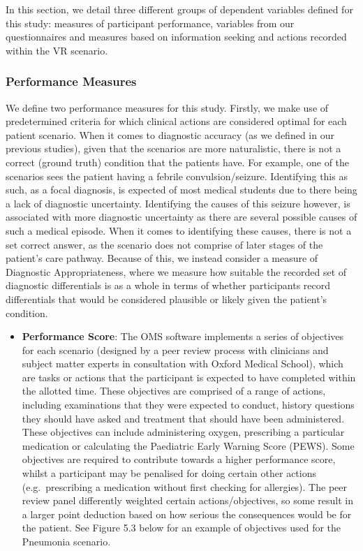 \documentclass[a4paper, nobind]{templates/ociamthesis}
\providecommand{\tightlist}{%
  \setlength{\itemsep}{0pt}\setlength{\parskip}{0pt}}
\begin{document}
In this section, we detail three different groups of dependent variables defined for this study: measures of participant performance, variables from our questionnaires and measures based on information seeking and actions recorded within the VR scenario.

\subsubsection*{Performance Measures}\label{performance-measures}

We define two performance measures for this study. Firstly, we make use of predetermined criteria for which clinical actions are considered optimal for each patient scenario. When it comes to diagnostic accuracy (as we defined in our previous studies), given that the scenarios are more naturalistic, there is not a correct (ground truth) condition that the patients have. For example, one of the scenarios sees the patient having a febrile convulsion/seizure. Identifying this as such, as a focal diagnosis, is expected of most medical students due to there being a lack of diagnostic uncertainty. Identifying the causes of this seizure however, is associated with more diagnostic uncertainty as there are several possible causes of such a medical episode. When it comes to identifying these causes, there is not a set correct answer, as the scenario does not comprise of later stages of the patient's care pathway. Because of this, we instead consider a measure of Diagnostic Appropriateness, where we measure how suitable the recorded set of diagnostic differentials is as a whole in terms of whether participants record differentials that would be considered plausible or likely given the patient's condition.

\begin{itemize}
\tightlist
\item
  \textbf{Performance Score}: The OMS software implements a series of objectives for each scenario (designed by a peer review process with clinicians and subject matter experts in consultation with Oxford Medical School), which are tasks or actions that the participant is expected to have completed within the allotted time. These objectives are comprised of a range of actions, including examinations that they were expected to conduct, history questions they should have asked and treatment that should have been administered. These objectives can include administering oxygen, prescribing a particular medication or calculating the Paediatric Early Warning Score (PEWS). Some objectives are required to contribute towards a higher performance score, whilst a participant may be penalised for doing certain other actions (e.g.~prescribing a medication without first checking for allergies). The peer review panel differently weighted certain actions/objectives, so some result in a larger point deduction based on how serious the consequences would be for the patient. See Figure 5.3 below for an example of objectives used for the Pneumonia scenario.
\end{itemize}
\end{document}
